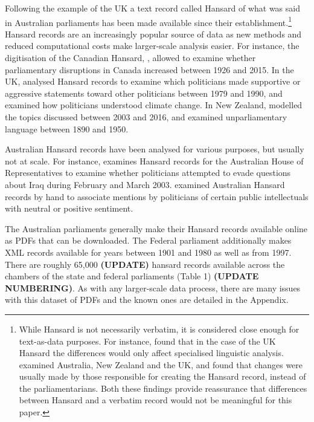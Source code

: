 \documentclass[12pt,]{article}
\begin{document}
Following the example of the UK a text record called Hansard of what was
said in Australian parliaments has been made available since their
establishment.\footnote{While Hansard is not necessarily verbatim, it is
  considered close enough for text-as-data purposes. For instance,
  \citet{Mollin2008} found that in the case of the UK Hansard the
  differences would only affect specialised linguistic analysis.
  \citet{Edwards2016} examined Australia, New Zealand and the UK, and
  found that changes were usually made by those responsible for creating
  the Hansard record, instead of the parliamentarians. Both these
  findings provide reassurance that differences between Hansard and a
  verbatim record would not be meaningful for this paper.} Hansard
records are an increasingly popular source of data as new methods and
reduced computational costs make larger-scale analysis easier. For
instance, the digitisation of the Canadian Hansard,
\citet{BeelenEtc2017}, allowed \citet{Whyte2017} to examine whether
parliamentary disruptions in Canada increased between 1926 and 2015. In
the UK, \citet{Duthie2016} analysed Hansard records to examine which
politicians made supportive or aggressive statements toward other
politicians between 1979 and 1990, and \citet{Willis2017} examined how
politicians understood climate change. In New Zealand,
\citet{Curran2017} modelled the topics discussed between 2003 and 2016,
and \citet{Graham2016} examined unparliamentary language between 1890
and 1950.

Australian Hansard records have been analysed for various purposes, but
usually not at scale. For instance, \citet{Rasiah2010} examines Hansard
records for the Australian House of Representatives to examine whether
politicians attempted to evade questions about Iraq during February and
March 2003. \citet{GansLeigh2012} examined Australian Hansard records by
hand to associate mentions by politicians of certain public
intellectuals with neutral or positive sentiment.

The Australian parliaments generally make their Hansard records
available online as PDFs that can be downloaded. The Federal parliament
additionally makes XML records available for years between 1901 and 1980
as well as from 1997. There are roughly 65,000 \textbf{(UPDATE)} hansard
records available across the chambers of the state and federal
parliaments (Table 1) \textbf{(UPDATE NUMBERING)}. As with any
larger-scale data process, there are many issues with this dataset of
PDFs and the known ones are detailed in the Appendix.
\end{document}
